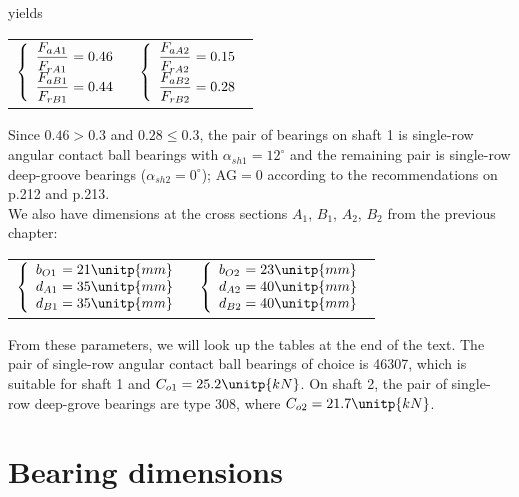 yields\vskip2mm
{\centering
	\begin{tabular}[t]{p{7cm}p{7cm}}
		$
		\left\{ 
		\begin{array}{l@{{} = {}}l}
		\dfrac{F_{aA1}}{F_{rA1}} & 0.46 \\
		\dfrac{F_{aB1}}{F_{rB1}} & 0.44 \\
		\end{array}
		\right.$
		& $
		\left\{ 
		\begin{array}{l@{{} = {}}l}
		\dfrac{F_{aA2}}{F_{rA2}} & 0.15 \\
		\dfrac{F_{aB2}}{F_{rB2}} & 0.28 \\
		\end{array}
		\right.$
\end{tabular}}\vskip2mm
Since $ 0.46>0.3 $ and $ 0.28\leq0.3 $, the pair of bearings on shaft 1 is single-row angular contact ball bearings with $ \alpha_{sh1} = 12^\circ$ and the remaining pair is single-row deep-groove bearings ($ \alpha_{sh2} = 0^\circ $); $ \text{AG} = 0 $ according to the recommendations on p.212 and p.213.\\
We also have dimensions at the cross sections $ A_1 $, $ B_1 $, $ A_2 $, $ B_2 $ from the previous chapter:\vskip2mm
{\centering
	\begin{tabular}[t]{p{6cm}p{7cm}}
		$
		\left\{ 
		\begin{array}{l@{{} = {}}l}
		b_{O1} & 21\unitp{mm}\\
		d_{A1} & 35\unitp{mm}\\
		d_{B1} & 35\unitp{mm}\\
		\end{array}
		\right.$
		& $
		\left\{ 
		\begin{array}{l@{{} = {}}l}
		b_{O2} & 23\unitp{mm}\\
		d_{A2} & 40\unitp{mm}\\
		d_{B2} & 40\unitp{mm}\\
		\end{array}
		\right.$
\end{tabular}}\vskip2mm
From these parameters, we will look up the tables at the end of the text. The pair of single-row angular contact ball bearings of choice is 46307, which is suitable for shaft 1 and $ C_{o1} = 25.2\unitp{kN} $. On shaft 2, the pair of single-row deep-grove bearings are type 308, where $ C_{o2}=21.7\unitp{kN} $.

\section{Bearing dimensions}

